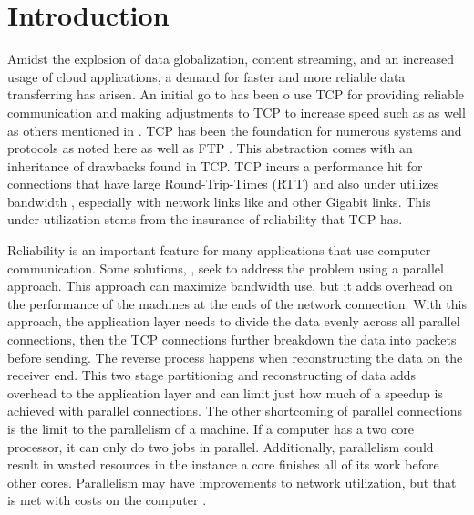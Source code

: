\chapter{Introduction}

Amidst the explosion of data globalization, content streaming, and an increased usage of cloud applications, a demand for faster and more reliable data transferring has arisen. An initial go to has been o use TCP for providing reliable communication and making adjustments to TCP to increase speed such as \cite{brakmo1995tcp}\cite{caini2004tcp}\cite{fu2003tcp}\cite{ha2008cubic} as well as others mentioned in \cite{ha2008cubic}\cite{He2002}. TCP has been the foundation for numerous systems and protocols as noted here \cite{Fan2010} as well as FTP \cite{Bhushan1971}. This abstraction comes with an inheritance of drawbacks found in TCP. TCP incurs a performance hit for connections that have large Round-Trip-Times (RTT) and also under utilizes bandwidth \cite{Fan2010}, especially with network links like \cite{Pfister2001} and other Gigabit links. This under utilization stems from the insurance of reliability that TCP has.

Reliability is an important feature for many applications that use computer communication. Some solutions, \cite{Allman1995}\cite{Allman1997}\cite{Sivakumar2000psockets}, seek to address the problem using a parallel approach. This approach can maximize bandwidth use, but it adds overhead on the performance of the machines at the ends of the network connection. With this approach, the application layer needs to divide the data evenly across all parallel connections, then the TCP connections further breakdown the data into packets before sending. The reverse process happens when reconstructing the data on the receiver end. This two stage partitioning and reconstructing of data adds overhead to the application layer and can limit just how much of a speedup is achieved with parallel connections. The other shortcoming of parallel connections is the limit to the parallelism of a machine. If a computer has a two core processor, it can only do two jobs in parallel. Additionally, parallelism could result in wasted resources in the instance a core finishes all of its work before other cores. Parallelism may have improvements to network utilization, but that is met with costs on the computer \cite{Leijen2009}.

